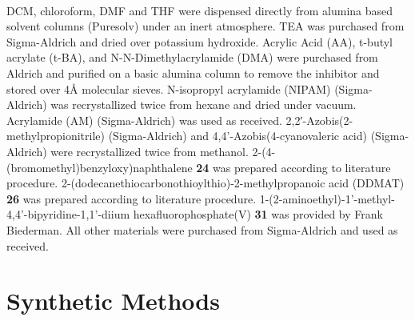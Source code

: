 \documentclass[a4wide,12pt]{report} %
\begin{document}
\\
DCM, chloroform, DMF and THF were dispensed directly from alumina based solvent columns (Puresolv) under an inert atmosphere. 
%
TEA was purchased from Sigma-Aldrich and dried over potassium hydroxide. 
%
Acrylic Acid (AA), t-butyl acrylate (t-BA), and N-N-Dimethylacrylamide (DMA) were purchased from Aldrich and purified on a basic alumina column to remove the inhibitor and stored over {4\AA} molecular sieves.
%
N-isopropyl acrylamide (NIPAM) (Sigma-Aldrich) was recrystallized twice from hexane and dried under vacuum. 
%
Acrylamide (AM) (Sigma-Aldrich) was used as received.
%
2,2′-Azobis(2-methylpropionitrile) (Sigma-Aldrich) and 4,4'-Azobis(4-cyanovaleric acid) (Sigma-Aldrich) were recrystallized twice from methanol. 
%
2-(4-(bromomethyl)benzyloxy)naphthalene  {\bf 24} was prepared according to literature procedure.\cite{Kim:2004p1558}
%
2-(dodecanethiocarbonothioylthio)-2-methylpropanoic acid (DDMAT) {\bf 26} was prepared according to literature procedure.\cite{Skey:2008p4456}
%
1-(2-aminoethyl)-1'-methyl-4,4'-bipyridine-1,1'-diium hexafluorophosphate(V)  {\bf 31} was provided by Frank Biederman.
%
All other materials were purchased from Sigma-Aldrich and used as received.





\section{Synthetic Methods}


\vspace{.3 in}
\end{document}
